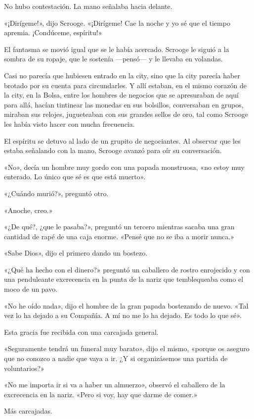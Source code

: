 \documentclass{novela}
\begin{document}
 No hubo contestación. La mano señalaba hacia delante.

 «¡Dirígeme!», dijo Scrooge. «¡Dirígeme! Cae la noche y yo sé que el tiempo apremia. ¡Condúceme, espíritu!»

 El fantasma se movió igual que se le había acercado. Scrooge le siguió a la sombra de su ropaje, que le sostenía ---pensó--- y le llevaba en volandas.

 Casi no parecía que hubiesen entrado en la city, sino que la city parecía haber brotado por su cuenta para circundarles. Y allí estaban, en el mismo corazón de la city, en la Bolsa, entre los hombres de negocios que se apresuraban de aquí para allá, hacían tintinear las monedas en sus bolsillos, conversaban en grupos, miraban sus relojes, jugueteaban con sus grandes sellos de oro, tal como Scrooge les había visto hacer con mucha frecuencia.

 El espíritu se detuvo al lado de un grupito de negociantes. Al observar que les estaba señalando con la mano, Scrooge avanzó para oír su conversación.

 «No», decía un hombre muy gordo con una papada monstruosa, «no estoy muy enterado. Lo único que sé es que está muerto».

 «¿Cuándo murió?», preguntó otro.

 «Anoche, creo.»

 «¿De qué?, ¿que le pasaba?», preguntó un tercero mientras sacaba una gran cantidad de rapé de una caja enorme. «Pensé que no se iba a morir nunca.»

 «Sabe Dios», dijo el primero dando un bostezo.

 «¿Qué ha hecho con el dinero?» preguntó un caballero de rostro enrojecido y con una penduleante excrecencia en la punta de la nariz que temblequeaba como el moco de un pavo.

 «No he oído nada», dijo el hombre de la gran papada bostezando de nuevo. «Tal vez lo ha dejado a su Compañía. A mí no me lo ha dejado. Es todo lo que sé».

 Esta gracia fue recibida con una carcajada general.

 «Seguramente tendrá un funeral muy barato», dijo el mismo, «porque os aseguro que no conozco a nadie que vaya a ir. ¿Y si organizásemos una partida de voluntarios?»

 «No me importa ir si va a haber un almuerzo», observó el caballero de la excrecencia en la nariz. «Pero si voy, hay que darme de comer.»

 Más carcajadas.
\end{document}
